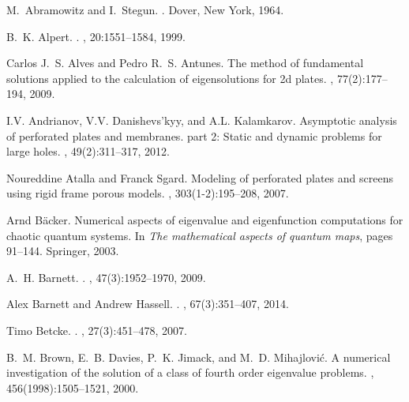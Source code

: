 \documentclass[times]{article}
\begin{document}
\begin{thebibliography}{10}

M.~Abramowitz and I.~Stegun.
.
\newblock Dover, New York, 1964.

B.~K. Alpert.
.
, 20:1551--1584, 1999.

Carlos J.~S. Alves and Pedro R.~S. Antunes.
\newblock The method of fundamental solutions applied to the calculation of
  eigensolutions for 2d plates.
,
  77(2):177--194, 2009.

I.V. Andrianov, V.V. Danishevs'kyy, and A.L. Kalamkarov.
\newblock Asymptotic analysis of perforated plates and membranes. part 2:
  Static and dynamic problems for large holes.
, 49(2):311--317,
  2012.

Noureddine Atalla and Franck Sgard.
\newblock Modeling of perforated plates and screens using rigid frame porous
  models.
, 303(1-2):195--208, 2007.

Arnd B{\"a}cker.
\newblock Numerical aspects of eigenvalue and eigenfunction computations for
  chaotic quantum systems.
\newblock In {\em The mathematical aspects of quantum maps}, pages 91--144.
  Springer, 2003.

A.~H. Barnett.
.
, 47(3):1952--1970, 2009.

Alex Barnett and Andrew Hassell.
.
, 67(3):351--407,
  2014.

Timo Betcke.
.
, 27(3):451--478, 2007.

B.~M. Brown, E.~B. Davies, P.~K. Jimack, and M.~D. Mihajlovi\'{c}.
\newblock A numerical investigation of the solution of a class of fourth order
  eigenvalue problems.
, 456(1998):1505--1521, 2000.


\end{thebibliography}
\end{document}
